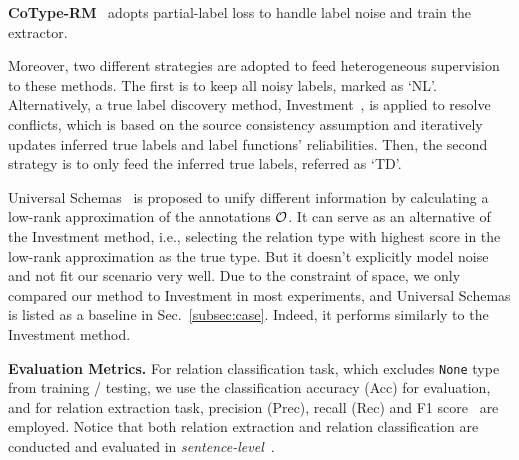 \noindent
\textbf{\small CoType-RM}~\cite{ren2016cotype} adopts partial-label loss to handle label noise and train the extractor.

Moreover, two different strategies are adopted to feed heterogeneous supervision to these methods. The first is to keep all noisy labels, marked as `NL'. 
Alternatively, a true label discovery method, Investment~\cite{pasternack2010knowing}, is applied to resolve conflicts, which is based on the source consistency assumption and iteratively updates inferred true labels and label functions' reliabilities. 
Then, the second strategy is to only feed the inferred true labels, referred as `TD'.

Universal Schemas~\cite{riedel2013relation} is proposed to unify different information by calculating a low-rank approximation of the annotations $\mathcal{O}$. 
It can serve as an alternative of the Investment method, i.e., selecting the relation type with highest score in the low-rank approximation as the true type. 
But it doesn’t explicitly model noise and not fit our scenario very well. 
Due to the constraint of space, we only compared our method to Investment in most experiments, and Universal Schemas is listed as a baseline in Sec.~\ref{subsec:case}. 
Indeed, it performs similarly to the Investment method. 

\smallskip
\noindent
\textsf{\small\textbf{Evaluation Metrics. }} 
For relation classification task, which excludes \texttt{None} type from training / testing, we use the classification accuracy (Acc) for evaluation, and for relation extraction task, precision (Prec), recall (Rec) and F1 score~\cite{bunescu2005subsequence,bach2007review} are employed.
Notice that both relation extraction and relation classification are conducted and evaluated in \textit{sentence-level}~\cite{bao2014knowledge}.

